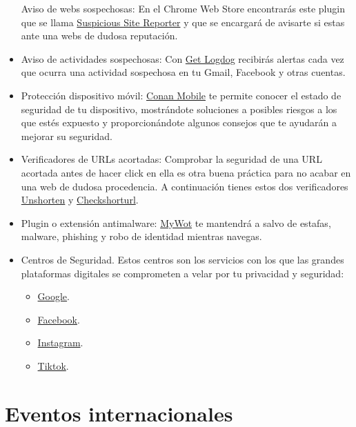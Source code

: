 \documentclass[
  spanish,
  a4paper,
  openany]{book}
\begin{document}
\begin{itemize}
  Aviso de webs sospechosas: En el Chrome Web Store encontrarás este plugin que se llama \href{https://chrome.google.com/webstore/detail/suspicious-site-reporter/jknemblkbdhdcpllfgbfekkdciegfboi}{Suspicious Site Reporter} y que se encargará de avisarte si estas ante una webs de dudosa reputación.
\item
  Aviso de actividades sospechosas: Con \href{https://getlogdog.com/}{Get Logdog} recibirás alertas cada vez que ocurra una actividad sospechosa en tu Gmail, Facebook y otras cuentas.
\item
  Protección dispositivo móvil: \href{https://www.osi.es/es/conan-mobile}{Conan Mobile} te permite conocer el estado de seguridad de tu dispositivo, mostrándote soluciones a posibles riesgos a los que estés expuesto y proporcionándote algunos consejos que te ayudarán a mejorar su seguridad.
\item
  Verificadores de URLs acortadas: Comprobar la seguridad de una URL acortada antes de hacer click en ella es otra buena práctica para no acabar en una web de dudosa procedencia. A continuación tienes estos dos verificadores \href{https://unshorten.it/}{Unshorten} y \href{https://checkshorturl.com/}{Checkshorturl}.
\item
  Plugin o extensión antimalware: \href{https://www.mywot.com/}{MyWot} te mantendrá a salvo de estafas, malware, phishing y robo de identidad mientras navegas.
\item
  Centros de Seguridad. Estos centros son los servicios con los que las grandes plataformas digitales se comprometen a velar por tu privacidad y seguridad:

  \begin{itemize}
  \item
    \href{https://safety.google}{Google}.
  \item
    \href{https://es-es.facebook.com/safety}{Facebook}.
  \item
    \href{https://about.instagram.com/es-la/community/safety}{Instagram}.
  \item
    \href{https://www.tiktok.com/safety?lang=es}{Tiktok}.
  \end{itemize}
\end{itemize}

\hypertarget{eventos-internacionales}{%
\section{Eventos internacionales}\label{eventos-internacionales}}
\end{document}
